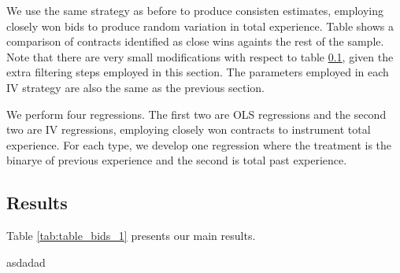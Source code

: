 We use the same strategy as before to produce consisten estimates, employing closely won bids to produce random variation in total experience. Table shows a comparison of contracts identified as close wins againts the rest of the sample. Note that there are very small modifications with respect to table \ref{}, given the extra filtering steps employed in this section. The parameters employed in each IV strategy are also the same as the previous section.

We perform four regressions. The first two are OLS regressions and the second two are IV regressions, employing closely won contracts to instrument total experience. For each type, we develop one regression where the treatment is the binarye of previous experience and the second is total past experience.

\subsection{Results}

Table \ref{tab:table_bids_1} presents our main results.



asdadad
